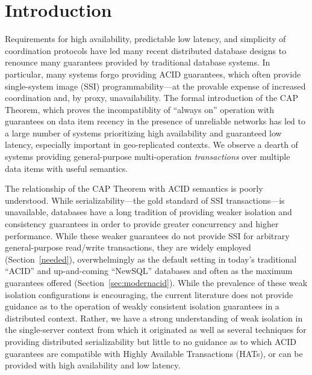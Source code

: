 

\section{Introduction}

Requirements for high availability, predictable low latency, and
simplicity of coordination protocols have led many recent distributed
database designs to renounce many guarantees provided by traditional
database systems. In particular, many systems forgo providing ACID
guarantees, which often provide single-system image (SSI)
programmability---at the provable expense of increased coordination
and, by proxy, unavailability. The formal introduction of the CAP
Theorem, which proves the incompatiblity of ``always on'' operation
with guarantees on data item recency in the presence of unreliable
networks has led to a large number of systems prioritizing high
availability and guaranteed low latency, especially important in
geo-replicated contexts. We observe a dearth of systems providing
general-purpose multi-operation \textit{transactions} over multiple
data items with useful semantics.

The relationship of the CAP Theorem with ACID semantics is poorly
understood. While serializability---the gold standard of SSI
transactions---is unavailable, databases have a long tradition of
providing weaker isolation and consistency guarantees in order to
provide greater concurrency and higher performance. While these weaker
guarantees do not provide SSI for arbitrary general-purpose read/write
transactions, they are widely employed (Section~\ref{needed}),
overwhelmingly as the default setting in today's traditional ``ACID''
and up-and-coming ``NewSQL'' databases and often as the maximum
guarantees offered (Section~\ref{sec:modernacid}). While the
prevalence of these weak isolation configurations is encouraging, the
current literature does not provide guidance as to the operation of
weakly consistent isolation guarantees in a distributed
context. Rather, we have a strong understanding of weak isolation in
the single-server context from which it originated as well as several
techniques for providing distributed serializability but little to no
guidance as to which ACID guarantees are compatible with Highly
Available Transactions (HATs), or can be provided with high
availability and low latency.

